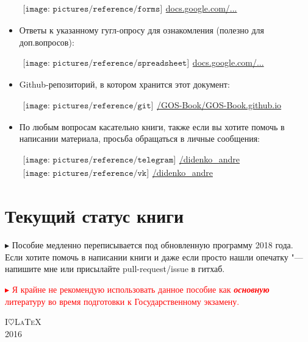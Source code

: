 \begin{flushleft}
\begin{itemize}[wide, labelwidth=!, labelindent=0pt, label=$\blacktriangleright$, noitemsep]
\qquad\href{https://docs.google.com/forms/d/1x9LqMZotqoWS5GLBTc1s1Wj7U3esVQiyJ_tYSZZ5AM4/edit?usp=sharing}{$
\begin{array}{l}
\texttt{[image: pictures/reference/forms]}
\end{array}
$\large docs.google.com/...}

\item Ответы к указанному гугл-опросу для ознакомления (полезно для доп.вопросов):

\qquad\href{https://docs.google.com/spreadsheets/d/1Aq82a0pVVuXpyv6fwNN1P86sjI8INdQkvCrGJTTHKNo/edit?usp=sharing}{$
	\begin{array}{l}
		\texttt{[image: pictures/reference/spreadsheet]}
	\end{array}
	$\large docs.google.com/...}

\item Github-репозиторий, в котором хранится этот документ:

\qquad\href{https://github.com/GOS-Book/GOS-Book.github.io}{$
\begin{array}{l}
\texttt{[image: pictures/reference/git]}
\end{array}
$\large /GOS-Book/GOS-Book.github.io}

\item По любым вопросам касательно книги, также если вы хотите помочь в написании материала, просьба обращаться в личные сообщения: 

\qquad\href{https://t.me/didenko_andre}{$
	\begin{array}{l}
	\texttt{[image: pictures/reference/telegram]}
	\end{array}
	$\large /didenko\_\!andre}
\qquad\href{https://vk.com/didenko_andre}{$
\begin{array}{l}
\texttt{[image: pictures/reference/vk]}
\end{array}
$\large /didenko\_\!andre}
\vspace*{-1\baselineskip}  
\end{itemize}

\section*{\Large Текущий статус книги}

$\blacktriangleright$ Пособие медленно переписывается под обновленную программу 2018 года. Если хотите помочь в написании книги и даже если просто нашли опечатку "--- напишите мне или присылайте pull-request/issue в гитхаб.

\smallskip

\vfill

\textcolor{red}{
$\blacktriangleright$ Я крайне не рекомендую использовать данное пособие как \textit{\textbf{основную}} литературу во время подготовки к Государственному экзамену.
}

\end{flushleft}

\medskip
\vfill
{\huge\scshape I\;$\heartsuit$\;\LaTeX}\\[0.5\baselineskip]
{\LARGE\scshape 2016}\par
\restoregeometry
\endgroup
\newpage
\pagestyle{fancy}